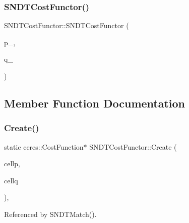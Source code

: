 \subsubsection{\texorpdfstring{S\+N\+D\+T\+Cost\+Functor()}{SNDTCostFunctor()}}
{\footnotesize\ttfamily S\+N\+D\+T\+Cost\+Functor\+::\+S\+N\+D\+T\+Cost\+Functor (\begin{DoxyParamCaption}\item[{const \hyperlink{classSNDTCell}{S\+N\+D\+T\+Cell} $\ast$}]{p\+\_\+,  }\item[{const \hyperlink{classSNDTCell}{S\+N\+D\+T\+Cell} $\ast$}]{q\+\_\+ }\end{DoxyParamCaption})\hspace{0.3cm}{\ttfamily [inline]}}



\subsection{Member Function Documentation}
\mbox{\label{structSNDTCostFunctor_a22ee42d8807a659af32c15d144ed0c6b}} 
\subsubsection{\texorpdfstring{Create()}{Create()}}
{\footnotesize\ttfamily static ceres\+::\+Cost\+Function$\ast$ S\+N\+D\+T\+Cost\+Functor\+::\+Create (\begin{DoxyParamCaption}\item[{const \hyperlink{classSNDTCell}{S\+N\+D\+T\+Cell} $\ast$}]{cellp,  }\item[{const \hyperlink{classSNDTCell}{S\+N\+D\+T\+Cell} $\ast$}]{cellq }\end{DoxyParamCaption})\hspace{0.3cm}{\ttfamily [inline]}, {\ttfamily [static]}}



Referenced by S\+N\+D\+T\+Match().

\mbox{\label{structSNDTCostFunctor_aa90d5ea666b39220dc48e0474172268b}} 
